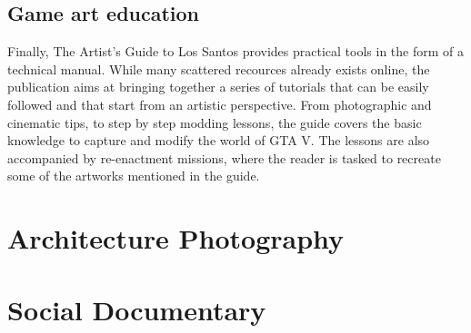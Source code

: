 \documentclass[
  openany]{book}
\begin{document}
\hypertarget{game-art-education}{%
\section{Game art education}\label{game-art-education}}

Finally, The Artist's Guide to Los Santos provides practical tools in the form of a technical manual. While many scattered recources already exists online, the publication aims at bringing together a series of tutorials that can be easily followed and that start from an artistic perspective. From photographic and cinematic tips, to step by step modding lessons, the guide covers the basic knowledge to capture and modify the world of GTA V. The lessons are also accompanied by re-enactment missions, where the reader is tasked to recreate some of the artworks mentioned in the guide.

\hypertarget{architecture-photography}{%
\chapter{Architecture Photography}\label{architecture-photography}}

\hypertarget{social-documentary}{%
\chapter{Social Documentary}\label{social-documentary}}
\end{document}
